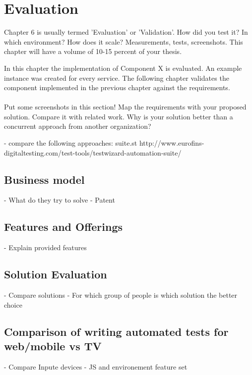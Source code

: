 \chapter{Evaluation\label{cha:chapter6}}

Chapter 6 is usually termed 'Evaluation' or 'Validation'. How did you test it? In which environment? How
does it scale? Measurements, tests, screenshots. This chapter will have a volume of 10-15 percent of your
thesis.

In this chapter the implementation of Component X is evaluated. An example instance was
created for every service. The following chapter validates the component implemented in
the previous chapter against the requirements.\\
\\
Put some screenshots in this section! Map the requirements with your proposed solution.
Compare it with related work. Why is your solution better than a concurrent approach from
another organization?

- compare the following approaches:
suite.st
http://www.eurofins-digitaltesting.com/test-tools/testwizard-automation-suite/

\section{Business model\label{sec:businessmodel}}

- What do they try to solve
- Patent

\section{Features and Offerings\label{sec:features}}

- Explain provided features

\section{Solution Evaluation\label{sec:usab}}

- Compare solutions
- For which group of people is which solution the better choice

\section{Comparison of writing automated tests for web/mobile vs TV\label{sec:diffInWritingTests}}

- Compare Inpute devices
- JS and environement feature set
